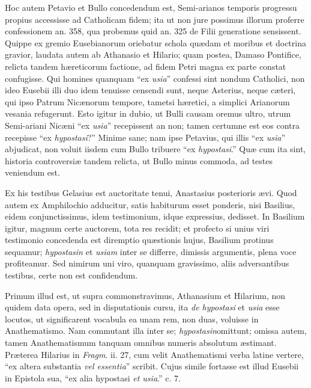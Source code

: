 Hoc autem
Petavio et Bullo concedendum est, Semi-arianos temporis progressu
propius accessisse ad Catholicam fidem; ita ut non jure possimus
illorum proferre confessionem an. 358, qua probemus quid an. 325 de
Filii generatione sensissent. Quippe ex gremio Eusebianorum oriebatur
schola quædam et moribus et doctrina gravior, laudata autem ab
Athanasio et Hilario; quam postea, Damaso Pontifice, relicta tandem hæreticorum
factione, ad fidem Petri magna ex parte constat confugisse. Qui
homines quanquam ``ex \emph{usia}'' confessi sint nondum Catholici, non
ideo Eusebii illi duo idem tenuisse censendi sunt, neque Asterius,
neque cæteri, qui ipso Patrum Nicænorum tempore, tametsi hæretici,
a simplici Arianorum vesania refugerunt. Esto igitur in dubio, ut
Bulli causam oremus ultro, utrum Semi-ariani Nicæni ``ex \emph{usia}''
recepissent an non; tamen certumne est eos contra recepisse ``ex \emph{hypostasi}?''
Minime sane; nam ipse Petavius, qui illis ``ex \emph{usia}'' abjudicat,
non voluit iisdem cum Bullo tribuere ``ex \emph{hypostasi}.'' Quæ cum
ita sint, historia controversiæ tandem relicta, ut Bullo minus
commoda, ad testes veniendum est.

Ex his
testibus Gelasius est auctoritate tenui, Anastasius posterioris ævi.
Quod autem ex Amphilochio adducitur, satis habiturum esset ponderis,
nisi Basilius, eidem conjunctissimus, idem testimonium, idque
expressius, dedisset. In Basilium igitur, magnum certe auctorem, tota
res recidit; et profecto si unius viri testimonio concedenda est
diremptio quæstionis hujus, Basilium protinus sequamur; \emph{hypostasin}
et \emph{usiam} inter se differre, dimissis argumentis, plena voce
profiteamur. Sed nimirum uni viro, quanquam gravissimo, aliis
adversantibus testibus, certe non est confidendum.

Primum
illud est, ut supra commonstravimus, Athanasium et Hilarium, non
quidem data opera, sed in disputationis cursu, ita \emph{de hypostasi}
et \emph{usia} esse locutos, ut significarent vocabula ea unam rem,
non duas, voluisse in Anathematismo. Nam commutant illa inter se; \emph{hypostasin}omittunt; omissa autem, tamen Anathematismum tanquam omnibus
numeris absolutum æstimant. Præterea Hilarius in \emph{Fragm}. ii.
27, cum velit Anathematismi verba latine vertere, ``ex altera
substantia \emph{vel essentia}'' scribit. Cujus simile fortasse est
illud Eusebii in Epistola sua, ``ex alia hypostasi \emph{et usia}.'' c.
7.

